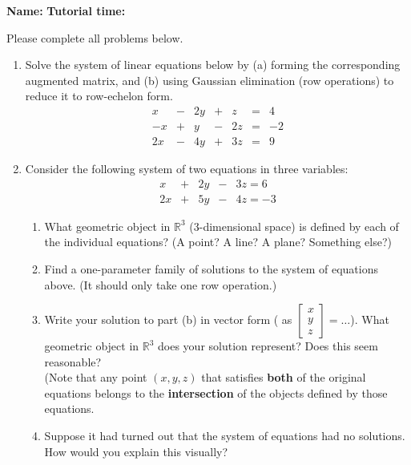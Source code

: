 \documentclass[12pt]{article}
\newcommand{\R}{\mathbb{R}}
\newcommand{\bbm}{\begin{bmatrix}}
\newcommand{\ebm}{\end{bmatrix}}
\begin{document}
{\bf \large Name:} \hspace{2.5in} {\bf Tutorial time:}

\bigskip


\thispagestyle{fancy}
Please complete all problems below.
 \begin{enumerate}
 \item Solve the system of linear equations below by (a) forming the corresponding augmented matrix, and (b) using Gaussian elimination (row operations) to reduce it to row-echelon form.
\[
 \begin{array}{ccccccc}
  x&-&2y&+&z&=&4\\
 -x&+&y&-&2z&=&-2\\
 2x&-&4y&+&3z&=&9
 \end{array}
\]

\newpage

 \item Consider the following system of two equations in three variables:
\[
 \begin{array}{ccccccc}
  x&+&2y&-&3z=6\\
 2x&+&5y&-&4z=-3
 \end{array}
\]
\begin{enumerate}
 \item What geometric object in $\R^3$ (3-dimensional space) is defined by each of the individual equations? (A point? A line? A plane? Something else?)

\vspace{0.5in}

 \item Find a one-parameter family of solutions to the system of equations above. (It should only take one row operation.)

\vspace{2.5in}

 \item Write your solution to part (b) in vector form ( as $\bbm x\\y\\z\ebm = \ldots$). What geometric object in $\R^3$ does your solution represent? Does this seem reasonable?\\ (Note that any point $(x,y,z)$ that satisfies {\bf both} of the original equations belongs to the {\bf intersection} of the objects defined by those equations.

\vspace{1.5in}

\item Suppose it had turned out that the system of equations had no solutions. How would you explain this visually?
\end{enumerate}




 \end{enumerate}
\newpage
\end{document}
